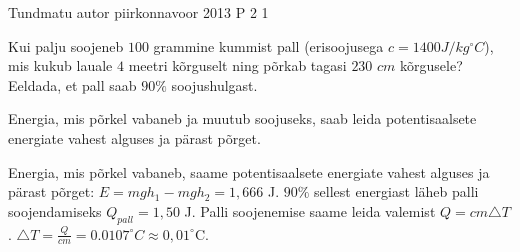 {Tundmatu autor} %
{piirkonnavoor} %
{2013} %
{P 2} %
{1} %
{

\ifStatement
Kui palju soojeneb $100$ grammine kummist pall (erisoojusega $c = 1400 J/kg^{\circ}C$), mis kukub lauale $4$ meetri kõrguselt ning põrkab tagasi $230$ $cm$ kõrgusele? Eeldada, et pall saab $90\%$ soojushulgast.
\fi

\ifHint
Energia, mis põrkel vabaneb ja muutub soojuseks, saab leida  potentisaalsete energiate vahest alguses ja pärast põrget.
\fi

\ifSolution
Energia, mis põrkel vabaneb, saame potentisaalsete energiate vahest alguses ja pärast põrget:
\newline
$E = mgh_1 - mgh_2 = 1,666$ J.
\newline
$90\%$ sellest energiast läheb palli soojendamiseks $Q_{pall} = 1,50$ J.
\newline
Palli soojenemise saame leida valemist $Q = cm\triangle T$.
\newline
$\triangle T = \frac{Q}{cm} = 0.0107 ^{\circ}C \approx 0,01 ^{\circ}$C.
\fi
}